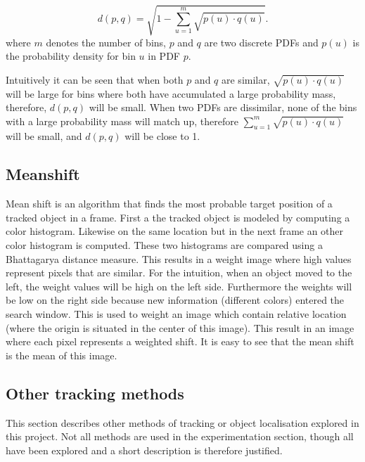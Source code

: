 \documentclass[a4paper,11pt]{article}
\begin{document}
\begin{equation}
\label{eq:bhattdistance}
d(p,q) = \sqrt{1-\sum_{u=1}^{m} \sqrt{p(u)\cdot q(u)}}.
\end{equation}
where $m$ denotes the number of bins, $p$ and $q$ are two discrete PDFs and $p(u)$ is the probability density for bin $u$ in PDF $p$. 

Intuitively it can be seen that when both $p$ and $q$ are similar, $\sqrt{p(u)\cdot q(u)}$ will be large for bins where both have accumulated a large probability mass, therefore, $d(p,q)$ will be small. When two PDFs are dissimilar, none of the bins with a large probability mass will match up, therefore  $\sum_{u=1}^{m} \sqrt{p(u)\cdot q(u)}$ will be small, and $d(p,q)$ will be close to 1.



		
\subsection{Meanshift}
Mean shift is an algorithm that finds the most probable target position of a tracked object in a frame. First a the tracked object is modeled by computing a color histogram. Likewise on the same location but in the next frame an other color histogram is computed. These two histograms are compared using a Bhattagarya distance measure. This results in a weight image where high values represent pixels that are similar.  For the intuition, when an object moved to the left, the weight values will be high on the left side. Furthermore the weights will be low on the right side because new information (different colors) entered the search window. 
This is used to weight an image which contain relative location (where the origin is situated in the center of this image). This result in an image where each pixel represents a weighted shift. It is easy to see that the mean shift is the mean of this image.

\subsection{Other tracking methods}
This section describes other methods of tracking or object localisation explored in this project. Not all methods are used in the experimentation section, though all have been explored and a short description is therefore justified.
\end{document}

